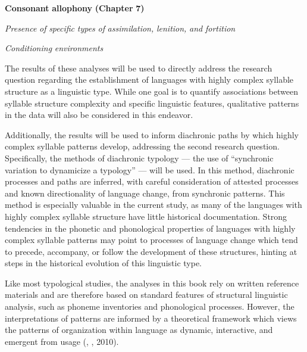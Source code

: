 \textbf{Consonant} \textbf{allophony} \textbf{(Chapter} \textbf{7)}

\textit{Presence} \textit{of} \textit{specific} \textit{types} \textit{of} \textit{assimilation,} \textit{lenition,} \textit{and} \textit{fortition}

\textit{Conditioning} \textit{environments}
\z

  The results of these analyses will be used to directly address the research question regarding the establishment of languages with highly complex syllable structure as a linguistic type. While one goal is to quantify associations between syllable structure complexity and specific linguistic features, qualitative patterns in the data will also be considered in this endeavor.

  Additionally, the results will be used to inform diachronic paths by which highly complex syllable patterns develop, addressing the second research question. Specifically, the methods of diachronic typology — the use of “synchronic variation to dynamicize a typology” \citep[272]{Croft2003} — will be used. In this method, diachronic processes and paths are inferred, with careful consideration of attested processes and known directionality of language change, from synchronic patterns. This method is especially valuable in the current study, as many of the languages with highly complex syllable structure have little historical documentation. Strong tendencies in the phonetic and phonological properties of languages with highly complex syllable patterns may point to processes of language change which tend to precede, accompany, or follow the development of these structures, hinting at steps in the historical evolution of this linguistic type.

  Like most typological studies, the analyses in this book rely on written reference materials and are therefore based on standard features of structural linguistic analysis, such as phoneme inventories and phonological processes. However, the interpretations of patterns are informed by a theoretical framework which views the patterns of organization within language as dynamic, interactive, and emergent from usage (\citealt{BecknerEtAl2009}, \citealt{Bybee2001}, 2010).

